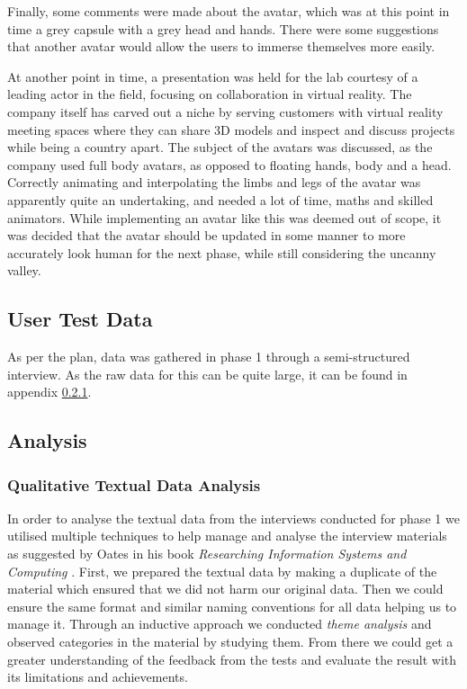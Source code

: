 Finally, some comments were made about the avatar, which was at this point in time a grey capsule with a grey head and hands. There were some suggestions that another avatar would allow the users to immerse themselves more easily. 

At another point in time, a presentation was held for the lab courtesy of a leading actor in the field, focusing on collaboration in virtual reality. The company itself has carved out a niche by serving customers with virtual reality meeting spaces where they can share 3D models and inspect and discuss projects while being a country apart. The subject of the avatars was discussed, as the company used full body avatars, as opposed to floating hands, body and a head. Correctly animating and interpolating the limbs and legs of the avatar was apparently quite an undertaking, and needed a lot of time, maths and skilled animators. While implementing an avatar like this was deemed out of scope, it was decided that the avatar should be updated in some manner to more accurately look human for the next phase, while still considering the uncanny valley. 



\subsection{User Test Data}
As per the plan, data was gathered in phase 1 through a semi-structured interview. As the raw data for this can be quite large, it can be found in appendix \ref{}.


\subsection{Analysis}
\subsubsection{Qualitative Textual Data Analysis}
In order to analyse the textual data from the interviews conducted for phase 1 we utilised multiple techniques to help manage and analyse the interview materials as suggested by Oates in his book \textit{Researching Information Systems and Computing } \cite{oates2005researching}. First, we prepared the textual data by making a duplicate of the material which ensured that we did not harm our original data. Then we could ensure the same format and similar naming conventions for all data helping us to manage it. Through an inductive approach \cite{oates2005researching} we conducted \textit{theme analysis} and observed categories in the material by studying them. From there we could get a greater understanding of the feedback from the tests and evaluate the result with its limitations and achievements.

